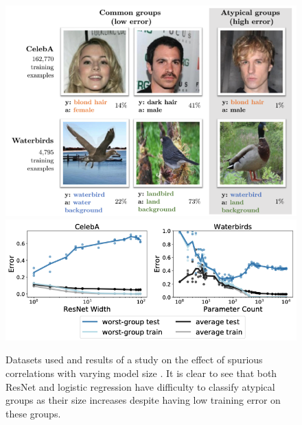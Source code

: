 \documentclass{article}
\begin{document}
\begin{figure}
    \centering
    \includegraphics[scale=0.2]{sagawa_dataset.png}
    \includegraphics[scale=0.28]{sagawa_diagram_standard.png}
    \caption{Datasets used and results of a study on the effect of spurious correlations with varying model size \cite{pmlr-v119-sagawa20a}.
    It is clear to see that both ResNet and logistic regression have
    difficulty to classify atypical groups as their size increases despite having low training error on these groups.}
    \label{fig:sagawaImg}
\end{figure}
\end{document}
